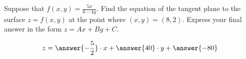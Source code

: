 \documentclass{ximera}
\author{Jim Talamo}
\begin{document}
\begin{exercise}

Suppose that $f(x,y) = \frac{5x}{6-4y}$. Find the equation of the tangent plane to the surface $z=f(x,y)$ at the point where $(x,y)=(8,2)$.  Express your final answer in the form $z=Ax+By+C$.

\[
z=  \answer{-\frac{5}{2}} \cdot x + \answer{40} \cdot  y + \answer{-80} 
\]

\end{exercise}
\end{document}
